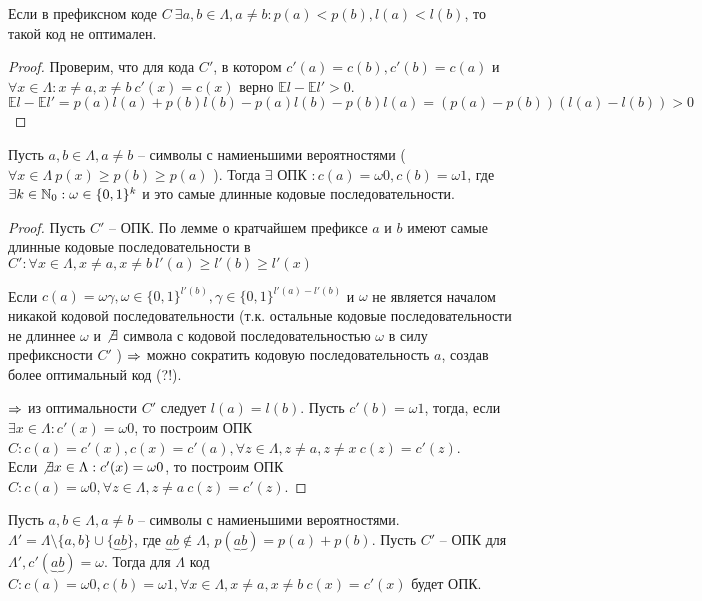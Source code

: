 	\begin{Lm}
		Если в префиксном коде $C \ \exists a, b \in \Lambda, a \neq b : p(a) < p(b), l(a) < l(b)$, то такой код не оптимален.
	\end{Lm}

	\begin{proof}
		Проверим, что для кода $C'$, в котором $c'(a) = c(b), c'(b) = c(a)$ и $\forall x \in \Lambda : x \neq a, x \neq b \ c'(x) = c(x)$ верно $\mathbb{E}l - \mathbb{E}l' > 0$.
		\[\mathbb{E} l - \mathbb{E} l' = p(a) l(a) + p(b) l(b) - p(a) l(b) - p(b) l(a) = (p(a) - p(b))(l(a) - l(b)) > 0\] 
	\end{proof}

	\begin{Lm}
		Пусть $a, b \in \Lambda, a \neq b$ -- символы с намиеньшими вероятностями ( $\forall x \in \Lambda \ p(x) \geqslant p(b) \geqslant p(a)$ ). 
		Тогда $\exists $ ОПК $: c(a) = \omega 0, c(b) = \omega 1$, где $\exists k \in \mathbb{N}_0 : \omega \in \{0, 1\}^k$ и это самые длинные кодовые последовательности.
	\end{Lm}

	\begin{proof}
		Пусть $C'$ -- ОПК. По лемме о кратчайшем префиксе $a$ и $b$ имеют самые длинные кодовые последовательности в $C' : \forall x \in \Lambda, x \neq a, x \neq b \ l'(a) \geqslant l'(b) \geqslant l'(x)$
		
		Если $c(a) = \omega \gamma, \omega \in \{0, 1\}^{l'(b)}, \gamma \in \{0, 1\}^{l'(a) - l'(b)}$ и $\omega$ не является началом никакой кодовой последовательности
		(т.к. остальные кодовые последовательности не длиннее $\omega$ и $\not\exists $ символа с кодовой последовательностью $\omega$ в силу префиксности $C'$ ) $\Rightarrow$ 
		можно сократить кодовую последовательность $a$, создав более оптимальный код (?!).

		$\Rightarrow$ из оптимальности $C'$ следует $l(a) = l(b)$. Пусть $c'(b) = \omega 1$, тогда, если 
		$\exists x \in \Lambda : c'(x) = \omega 0$, то построим ОПК $C : c(a) = c'(x), c(x) = c'(a), \forall z \in \Lambda, z \neq a, z \neq x \ c(z) = c'(z)$. \\
		Если $\not\exists x \in \Lambda : c'(x) = \omega0$, то построим ОПК $C : c(a) = \omega0, \forall z \in \Lambda, z \neq a \ c(z) = c'(z)$.
	\end{proof}

	\begin{Lm}
		Пусть $a, b \in \Lambda, a \neq b$ -- символы с намиеньшими вероятностями.
		$\Lambda' = \Lambda \setminus \{a, b\} \cup \{\underbrace{ab}\}$, где $\underbrace{ab} \notin \Lambda$, $p(\underbrace{ab}) = p(a) + p(b)$.
		Пусть $C'$ -- ОПК для $\Lambda', c'(\underbrace{ab}) = \omega$. Тогда для $\Lambda$ код $C : c(a) = \omega 0, c(b) = \omega 1, \forall x \in \Lambda, x \neq a, x \neq b \ c(x) = c'(x)$ будет ОПК.
	\end{Lm}

